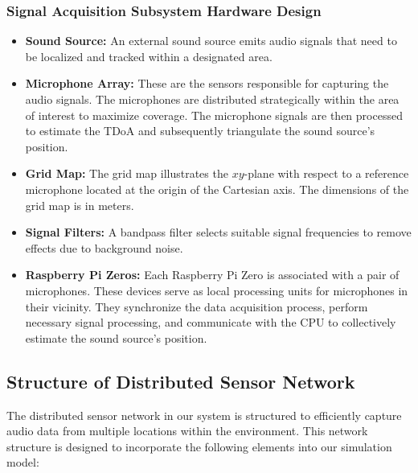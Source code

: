 \documentclass[a4paper,11pt]{article}
\begin{document}
\subsubsection{Signal Acquisition Subsystem Hardware Design}
\begin{itemize}
	\item 
	\textbf{Sound Source:} An external sound source emits audio signals that need to be localized and tracked within a designated area.
	\item
	\textbf{Microphone Array:} These are the sensors responsible for capturing the audio signals. The microphones are distributed strategically within the area of interest to maximize coverage. The microphone signals are then processed to estimate the TDoA and subsequently triangulate the sound source's position.
	\item 
	\textbf{Grid Map:} The grid map illustrates the $xy$-plane with respect to a reference microphone located at the origin of the Cartesian axis. The dimensions of the grid map is in meters. 
	\item 
	\textbf{Signal Filters:} A bandpass filter selects suitable signal frequencies to remove effects due to background noise. 
	\item 
	\textbf{Raspberry Pi Zeros:} Each Raspberry Pi Zero is associated with a pair of microphones. These devices serve as local processing units for microphones in their vicinity. They synchronize the data acquisition process, perform necessary signal processing, and communicate with the CPU to collectively estimate the sound source's position.
\end{itemize}

\subsection{Structure of Distributed Sensor Network}

The distributed sensor network in our system is structured to efficiently capture audio data from multiple locations within the environment. This network structure is designed to incorporate the following elements into our simulation model: 
\end{document}
